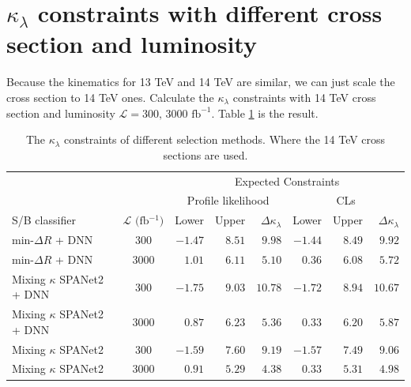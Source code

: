 \documentclass[12pt]{article}
\begin{document}
\section{\texorpdfstring{$\kappa_\lambda$}{kappa} constraints with different cross section and luminosity}%
\label{sec:kappa_constraints_with_different_cross_section_and_luminosity}
	Because the kinematics for 13 TeV and 14 TeV are similar, we can just scale the cross section to 14 TeV ones. Calculate the $\kappa_\lambda$ constraints with 14 TeV cross section and luminosity $\mathcal{L} = \text{300, 3000 fb}^{-1}$. Table \ref{tab:kappa_constraint_summary4} is the result.
	\begin{table}[htpb]
		\centering
		\caption{The $\kappa_\lambda$ constraints of different selection methods. Where the 14 TeV cross sections are used.}
		\label{tab:kappa_constraint_summary4}
		\begin{tabular}{l|c|rrr|rrr}
									  &                                   & \multicolumn{6}{c}{Expected Constraints}                                          \\
									  &                                   & \multicolumn{3}{c}{Profile likelihood}  & \multicolumn{3}{c}{CLs}                 \\ \hline
		S/B classifier                & $\mathcal{L} \text{ (fb$^{-1}$)}$ & Lower & Upper & $\Delta \kappa_\lambda$ & Lower & Upper & $\Delta \kappa_\lambda$ \\ \hline
		$\text{min-}\Delta R$ + DNN   & 300  & $-1.47 $ & $8.51$ & $9.98 $ & $-1.44$ & $8.49$ & $9.92 $ \\
		$\text{min-}\Delta R$ + DNN   & 3000 & $1.01  $ & $6.11$ & $5.10 $ & $0.36 $ & $6.08$ & $5.72 $ \\ \hline
		Mixing $\kappa$ SPANet2 + DNN & 300  & $-1.75 $ & $9.03$ & $10.78$ & $-1.72$ & $8.94$ & $10.67$ \\
		Mixing $\kappa$ SPANet2 + DNN & 3000 & $0.87  $ & $6.23$ & $5.36 $ & $0.33 $ & $6.20$ & $5.87 $ \\ \hline
		Mixing $\kappa$ SPANet2       & 300  & $-1.59 $ & $7.60$ & $9.19 $ & $-1.57$ & $7.49$ & $9.06 $ \\
		Mixing $\kappa$ SPANet2       & 3000 & $0.91  $ & $5.29$ & $4.38 $ & $0.33 $ & $5.31$ & $4.98 $
		\end{tabular}
	\end{table}
\end{document}
